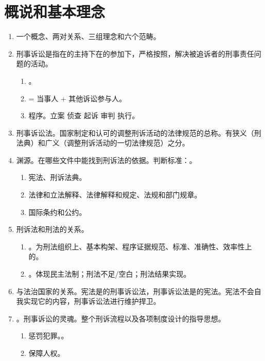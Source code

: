 \section{概说和基本理念}
\begin{enumerate}
  \item 一个概念、两对关系、三组理念和六个范畴。
  \item 刑事诉讼是指在的主持下在的参加下，严格按照，解决被追诉者的刑事责任问题的活动。
        \begin{enumerate}
          \item {}。
          \item {} = 当事人 + 其他诉讼参与人。
          \item 程序。立案 \yjt 侦查 \yjt 起诉 \yjt 审判 \yjt 执行。
        \end{enumerate}
  \item 刑事诉讼法。国家制定和认可的调整刑诉活动的法律规范的总称。有狭义（刑法典）和广义（调整刑诉活动的一切法律规范）之分。
  \item 渊源。在哪些文件中能找到刑诉法的依据。判断标准：。
        \begin{enumerate}
          \item 宪法、刑诉法典。
          \item 法律和立法解释、法律解释和规定、法规和部门规章。
          \item 国际条约和公约。
        \end{enumerate}
  \item 刑诉法和刑法的关系。
        \begin{enumerate}
          \item {}。为刑法组织上、基本构架、程序证据规范、标准、准确性、效率性上的。
          \item {}。体现民主法制；刑法不足/空白；刑法结果实现。
        \end{enumerate}
  \item 与法治国家的关系。宪法是的刑事诉讼法，刑事诉讼法是的宪法。宪法不会自我实现它的内容，刑事诉讼法进行维护捍卫。
  \item {}。刑事诉讼的灵魂。整个刑诉流程以及各项制度设计的指导思想。
        \begin{enumerate}
          \item 惩罚犯罪。。
          \item 保障人权。

\end{enumerate}
\end{enumerate}

